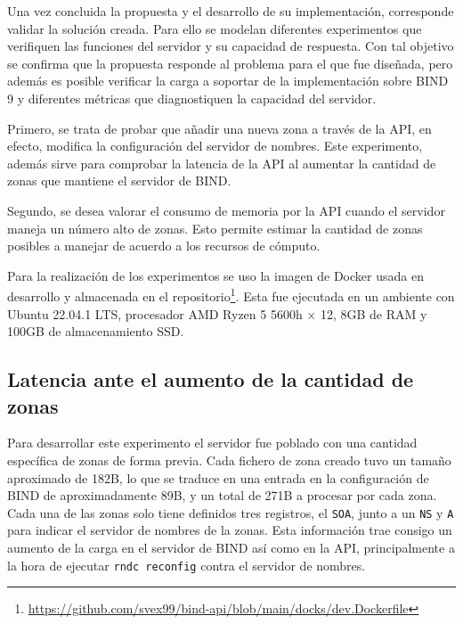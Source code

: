Una vez concluida la propuesta y el desarrollo de su implementación, corresponde validar la solución creada. Para ello se modelan diferentes experimentos que verifiquen las funciones del servidor y su capacidad de respuesta. Con tal objetivo se confirma que la propuesta responde al problema para el que fue diseñada, pero además es posible verificar la carga a soportar de la implementación sobre BIND 9 y diferentes métricas que diagnostiquen la capacidad del servidor.

Primero, se trata de probar que añadir una nueva zona a través de la API, en efecto, modifica la configuración del servidor de nombres. Este experimento, además sirve para comprobar la latencia de la API al aumentar la cantidad de zonas que mantiene el servidor de BIND.

Segundo, se desea valorar el consumo de memoria por la API cuando el servidor maneja un número alto de zonas. Esto permite estimar la cantidad de zonas posibles a manejar de acuerdo a los recursos de cómputo.

Para la realización de los experimentos se uso la imagen de Docker usada en desarrollo y almacenada en el repositorio\footnote{\url{https://github.com/svex99/bind-api/blob/main/docks/dev.Dockerfile}}. Esta fue ejecutada en un ambiente con Ubuntu 22.04.1 LTS, procesador AMD Ryzen 5 5600h × 12, 8GB de RAM y 100GB de almacenamiento SSD.

\subsection{Latencia ante el aumento de la cantidad de zonas}

Para desarrollar este experimento el servidor fue poblado con una cantidad específica de zonas de forma previa. Cada fichero de zona creado tuvo un tamaño aproximado de 182B, lo que se traduce en una entrada en la configuración de BIND de aproximadamente 89B, y un total de 271B a procesar por cada zona. Cada una de las zonas solo tiene definidos tres registros, el \verb|SOA|, junto a un \verb|NS| y \verb|A| para indicar el servidor de nombres de la zonas. Esta información trae consigo un aumento de la carga en el servidor de BIND así como en la API, principalmente a la hora de ejecutar \verb|rndc reconfig| contra el servidor de nombres.


